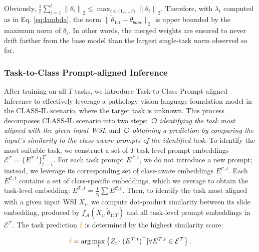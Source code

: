 \documentclass[10pt,twocolumn,letterpaper]{article}
\begin{document}
\noindent Obviously, $\frac{1}{t} \sum_{i=1}^{t} \left\| \theta_i \right\|_2 \leq \max_{i \in \{1,\dots,t\}} \left\| \theta_i \right\|_2$. Therefore, with $\lambda_t$ computed as in Eq. \eqref{eq:lambda}, the norm $\|\tilde{\theta}_{1:t} - \theta_{base}\|_2$ is upper bounded by the maximum norm of $\theta_i$. In other words, the merged weights are ensured to never drift farther from the base model than the largest single-task norm observed so far.



\noindent\subsubsection{Task-to-Class Prompt-aligned Inference}\label{sec:pai} After training on all $T$ tasks, we introduce Task-to-Class Prompt-aligned Inference to effectively leverage a pathology vision-language foundation model in the {CLASS-IL scenario}, where the target task is unknown. This process decomposes CLASS-IL scenario into two steps: \textit{\textcircled{} identifying the task most aligned with the given input WSI}, and \textit{\textcircled{} obtaining a prediction by comparing the input’s similarity to the class-aware prompts of the identified task}. To identify the most suitable task, we construct a set of $T$ task-level prompt embeddings $\mathcal{E}^\mathcal{T} = \{E^{\mathcal{T},t}\}_{t=1}^T$. For each task prompt $E^{\mathcal{T},t}$, we do not introduce a new prompt; instead, we leverage its corresponding set of class-aware embeddings $E^{\mathcal{C},t}$. Each $E^{\mathcal{C},t}$ contains a set of class-specific embeddings, which we average to obtain the task-level embedding: $E^{\mathcal{T},t} = \frac{1}{c_t} \sum E^{\mathcal{C},t}$. Then, to identify the task most aligned with a given input WSI $X_i$, we compute dot-product similarity between its slide embedding, produced by $f_{\mathcal{A}}(X_i,\tilde{\theta}_{1:T})$ and all task-level prompt embeddings in $\mathcal{E}^\mathcal{T}$. The task prediction $\textcolor{orange}{\hat{t}}$ is determined by the highest similarity score:

\begin{equation}
\textcolor{orange}{\hat{t}} = \arg \max_{t} \left\{Z_i \cdot (E^{\mathcal{T},t})^\top | \forall E^{\mathcal{T},t} \in \mathcal{E}^{\mathcal{T}}\right\}.
\end{equation}
\end{document}
